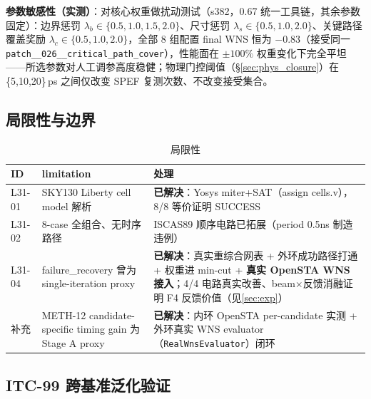 \documentclass[journal]{IEEEtran}
\begin{document}
\textbf{参数敏感性（实测）}：对核心权重做扰动测试（s382，0.67 统一工具链，其余参数固定）：边界惩罚 $\lambda_b \in \{0.5,1.0,1.5,2.0\}$、尺寸惩罚 $\lambda_s \in \{0.5,1.0,2.0\}$、关键路径覆盖奖励 $\lambda_c \in \{0.5,1.0,2.0\}$，全部 8 组配置 final WNS 恒为 $-0.83$（接受同一 \texttt{patch\_\_026\_\_critical\_path\_cover}），性能面在 $\pm 100\%$ 权重变化下完全平坦——所选参数对人工调参高度稳健；物理门控阈值（\S\ref{sec:phys_closure}）在 \{5,10,20\}\,ps 之间仅改变 SPEF 复测次数、不改变接受集合。

\subsection{局限性与边界}

\begin{table}[!t]
\centering
\caption{局限性}
\label{tab:limitations}
\scriptsize
\setlength{\tabcolsep}{3pt}
\begin{tabular}{p{}p{}p{}}
\toprule
\textbf{ID} & \textbf{limitation} & \textbf{处理} \\
\midrule
L31-01 & SKY130 Liberty cell model 解析 & \textbf{已解决}：Yosys miter+SAT（assign cells.v），8/8 等价证明 SUCCESS \\
L31-02 & 8-case 全组合、无时序路径 & ISCAS89 顺序电路已拓展（period 0.5ns 制造违例） \\
L31-04 & failure\_recovery 曾为 single-iteration proxy & \textbf{已解决}：真实重综合网表 + 外环成功路径打通 + 权重进 min-cut + \textbf{真实 OpenSTA WNS 接入}；4/4 电路真实改善、beam$\times$反馈消融证明 F4 反馈价值（见\ref{sec:exp}） \\
补充 & METH-12 candidate-specific timing gain 为 Stage A proxy & \textbf{已解决}：内环 OpenSTA per-candidate 实测 + 外环真实 WNS evaluator（\texttt{RealWnsEvaluator}）闭环 \\
\bottomrule
\end{tabular}
\end{table}

\subsection{ITC-99 跨基准泛化验证}\label{sec:itc99}
\end{document}
